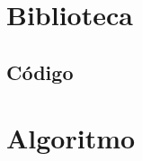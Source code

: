 \documentclass[
	12pt,				%
	openright,			%
	oneside,			%
	a4paper,			%
	english,			%
	french,				%
	spanish,			%
	brazil				%
	]{abntex2}
\begin{document}






\postextual


%
%

\begin{anexosenv}
\chapter{Biblioteca}
\section{Código}

\chapter{Algoritmo}
\end{anexosenv}
\printindex
\end{document}
